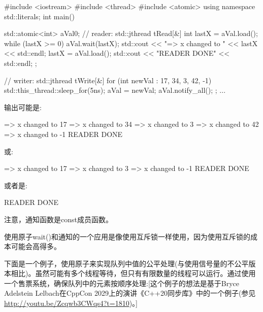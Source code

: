 
\begin{cpp}
#include <iostream>
#include <thread>
#include <atomic>
using namespace std::literals;
int main()
{
	std::atomic<int> aVal{0};
	// reader:
	std::jthread tRead{[&] {
						int lastX = aVal.load();
						while (lastX >= 0) {
							aVal.wait(lastX);
							std::cout << "=> x changed to " << lastX << std::endl;
							lastX = aVal.load();
						}
						std::cout << "READER DONE" << std::endl;
				}};

	// writer:
	std::jthread tWrite{[&] {
						for (int newVal : { 17, 34, 3, 42, -1}) {
							std::this_thread::sleep_for(5ns);
							aVal = newVal;
							aVal.notify_all();
						}
				}};
	...
}
\end{cpp}

输出可能是:

\begin{shell}
=> x changed to 17
=> x changed to 34
=> x changed to 3
=> x changed to 42
=> x changed to -1
READER DONE
\end{shell}

或:

\begin{shell}
=> x changed to 17
=> x changed to 3
=> x changed to -1
READER DONE
\end{shell}

或者是:

\begin{shell}
READER DONE
\end{shell}

注意，通知函数是const成员函数。


使用原子wait()和通知的一个应用是像使用互斥锁一样使用，因为使用互斥锁的成本可能会高得多。

下面是一个例子，使用原子来实现队列中值的公平处理(与使用信号量的不公平版本相比)。虽然可能有多个线程等待，但只有有限数量的线程可以运行。通过使用一个售票系统，确保队列中的元素按顺序处理:[这个例子的想法是基于Bryce Adelstein Lelbach在CppCon 2029上的演讲《C++20同步库》中的一个例子(参见\url{http://youtu.be/Zcqwb3CWqs4?t=1810})。]


